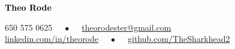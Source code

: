 \documentclass[9pt]{developercv} %
\begin{document}
	
	
	
	


{{\Huge\textcolor{black}{\textbf{{Theo Rode}}}}}

\vspace{0.2cm}
650 575 0625 $\quad\bullet\quad$ \href{mailto:theorodester@gmail.com}{theorodester@gmail.com} \\
\href{https://www.linkedin.com/in/theorode/}{linkedin.com/in/theorode} $\quad\bullet\quad$ \href{https://github.com/TheSharkhead2}{github.com/TheSharkhead2}
\end{document}
